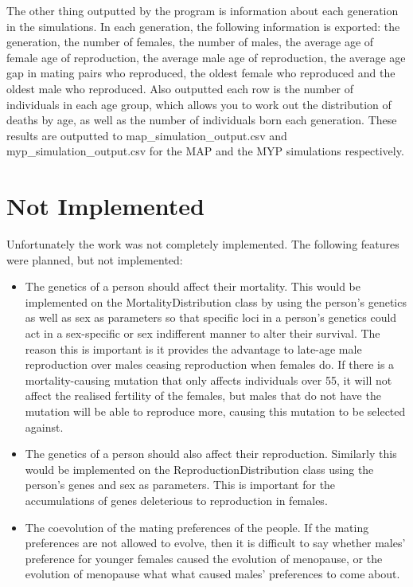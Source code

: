 \documentclass[authoryearcitations]{UoYCSproject}
\begin{document}
The other thing outputted by the program is information about each generation in the simulations. In each generation, the following information is exported: the generation, the number of females, the number of males, the average age of female age of reproduction, the average male age of reproduction, the average age gap in mating pairs who reproduced, the oldest female who reproduced and the oldest male who reproduced. Also outputted each row is the number of individuals in each age group, which allows you to work out the distribution of deaths by age, as well as the number of individuals born each generation. These results are outputted to map\_simulation\_output.csv and myp\_simulation\_output.csv for the MAP and the MYP simulations respectively.

\section{Not Implemented}
Unfortunately the work was not completely implemented. The following features were planned, but not implemented:

\begin{itemize}
\item The genetics of a person should affect their mortality. This would be implemented on the MortalityDistribution class by using the person's genetics as well as sex as parameters so that specific loci in a person's genetics could act in a sex-specific or sex indifferent manner to alter their survival. The reason this is important is it provides the advantage to late-age male reproduction over males ceasing reproduction when females do. If there is a mortality-causing mutation that only affects individuals over 55, it will not affect the realised fertility of the females, but males that do not have the mutation will be able to reproduce more, causing this mutation to be selected against.
\item The genetics of a person should also affect their reproduction. Similarly this would be implemented on the ReproductionDistribution class using the person's genes and sex as parameters. This is important for the accumulations of genes deleterious to reproduction in females.
\item The coevolution of the mating preferences of the people. If the mating preferences are not allowed to evolve, then it is difficult to say whether males' preference for younger females caused the evolution of menopause, or the evolution of menopause what what caused males' preferences to come about. 
\end{itemize}
\end{document}
